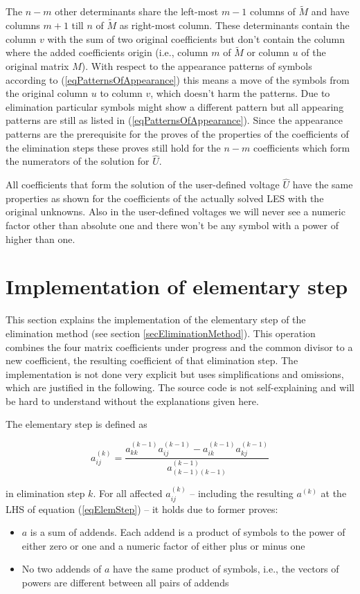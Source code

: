 The $n-m$ other determinants share the left-most $m-1$ columns of $\tilde
M$ and have columns $m+1$ till $n$ of $\tilde M$ as right-most column.
These determinants contain the column $v$ with the sum of two original
coefficients but don't contain the column where the added coefficients
origin (i.e., column $m$ of $\tilde M$ or column $u$ of the original matrix
$M$). With respect to the appearance patterns of symbols according to
(\ref{eqPatternsOfAppearance}) this means a move of the symbols from the
original column $u$ to column $v$, which doesn't harm the patterns. Due to
elimination particular symbols might show a different pattern but all
appearing patterns are still as listed in (\ref{eqPatternsOfAppearance}).
Since the appearance patterns are the prerequisite for the proves of the
properties of the coefficients of the elimination steps these proves still
hold for the $n-m$ coefficients which form the numerators of the solution
for $\hat U$.

All coefficients that form the solution of the user-defined voltage $\hat
U$ have the same properties as shown for the coefficients of the actually
solved LES with the original unknowns. Also in the user-defined voltages
we will never see a numeric factor other than absolute one and there won't
be any symbol with a power of higher than one.

\section{Implementation of elementary step}

This section explains the implementation of the elementary step of the
elimination method (see section \ref{secEliminationMethod}). This
operation combines the four matrix coefficients under progress and the
common divisor to a new coefficient, the resulting coefficient of that
elimination step. The implementation is not done very explicit but uses
simplifications and omissions, which are justified in the following. The
source code is not self-explaining and will be hard to understand without
the explanations given here.

The elementary step is defined as

\begin{equation}
\label{eqElemStep}
a^{(k)}_{ij} = \frac{a^{(k-1)}_{kk} a^{(k-1)}_{ij} - a^{(k-1)}_{ik} a^{(k-1)}_{kj}}
                    {a^{(k-1)}_{(k-1)(k-1)}}
\end{equation}

\noindent
in elimination step $k$. For all affected $a^{(k)}_{ij}$ -- including the
resulting $a^{(k)}$ at the LHS of equation (\ref{eqElemStep}) -- it holds
due to former proves:
\begin{itemize}
  \item $a$ is a sum of addends. Each addend is a product of symbols to
    the power of either zero or one and a numeric factor of either plus or
    minus one
  \item No two addends of $a$ have the same product of symbols, i.e., the
    vectors of powers are different between all pairs of addends
\end{itemize}

